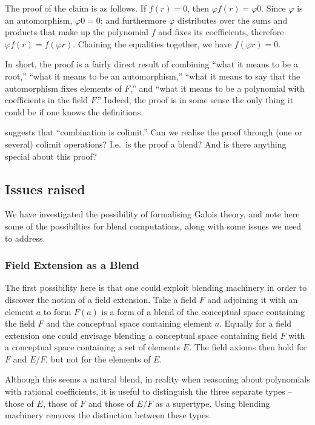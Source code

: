 The proof of the claim is as follows.  If $f(r)=0$, then $\varphi
f(r)=\varphi 0$.  Since $\varphi$ is an automorphism, $\varphi 0 = 0$;
and furthermore $\varphi$ distributes over the sums and products that
make up the polynomial $f$ and fixes its coefficients, therefore
$\varphi f(r)=f(\varphi r)$.  Chaining the equalities together, we
have $f(\varphi r)=0$.

In short, the proof is a fairly direct result of combining ``what it
means to be a root,'' ``what it means to be an automorphism,''
``what it means to say that the automorphism fixes elements of $F$,''
and
``what it means to be a polynomial with coefficients in the
field $F$.''
Indeed, the proof is in some sense the only thing it could be if one
knows the definitions.  

\textcite{Goguen92sheafsemantics} suggests that ``combination is
colimit.''  Can we realise the proof through (one or several) colimit
operations?  I.e.~is the proof a blend?  And is there anything special
about this proof?

\subsection{Issues raised}

We have investigated the possibility of formalising Galois theory, and
note here some of the possibilties for blend computations, along with
some issues we need to address.

\subsubsection{Field Extension as a Blend}

The first possibility here is that one could exploit blending
machinery in order to discover the notion of a field extension. Take a
field $F$ and adjoining it with an element $a$ to form $F(a)$ is a
form of a blend of the conceptual space containing the field $F$ and
the conceptual space containing element $a$. Equally for a field
extension one could envisage blending a conceptual space containing
field $F$ with a conceptual space containing a set of elements
$E$. The field axioms then hold for $F$ and $E/F$, but not for the
elements of $E$.

Although this seems a natural blend, in reality when reasoning about
polynomials with rational coefficients, it is useful to distinguish
the three separate types -- those of $E$, those of $F$ and those of
$E/F$ as a supertype. Using blending machinery removes the distinction
between these types.

